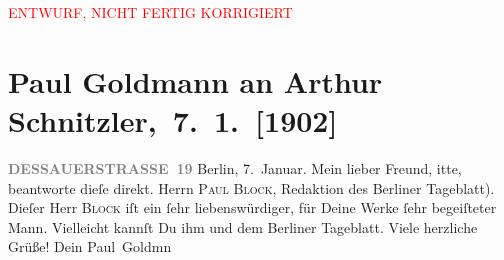 
\begin{center}
            \textcolor{red}{ENTWURF, NICHT FERTIG KORRIGIERT}
                      \end{center}
            
         
         \renewcommand{\erwaehntePersonen}{Personen: Paul Block}
         \renewcommand{\erwaehnteInstitutionen}{Institutionen: Berliner Tageblatt}
         \renewcommand{\erwaehnteOrte}{Orte: Berlin, Dessauer Straße, Wien}
         \renewcommand{\erwaehnteWerke}{}
               \section[ Paul Goldmann an Arthur Schnitzler, 7. 1. {[}1902{]}]{ Paul Goldmann an Arthur Schnitzler, 7. 1. {[}1902{]}}\nopagebreak{}\rehead{ }\begin{ledgroupsized}[t]{13cm}\normalsize\beginnumbering \toendnotes[C]{\smallbreak\pagebreak[2]} 
\toendnotes[C]{\smallbreak}\pstart
           \noindent{}\raggedleft{}{\pb}\textcolor{gray}{\textbf{DESSAUERSTRASSE 19}}\pend
           \pstart
           Berlin, 7. Januar.\pend
           \pstart\center{}Mein lieber Freund,\pend\pstart
           itte, beantworte dieſe \label{K_L03191-2v}\label{K_L03191-2h}
               direkt. \damage{(}Herrn \textsc{Paul Block}, Redaktion des Berliner Tageblatt).  Dieſer Herr \textsc{Block} iſt ein ſehr liebenswürdiger, für Deine Werke ſehr begeiſteter Mann. Vielleicht
               kannſt Du ihm und dem Berliner Tageblatt\label{K_L03191-1v}\label{K_L03191-1h}. Viele herzliche Grüße! Dein \spacefill\mbox{Paul
                  Goldmn}\pend
           
         
         \endnumbering{}\end{ledgroupsized}  \newcommand{\dateiname}{L03191}\newcommand{\titel}{Paul Goldmann an Arthur Schnitzler, 7. 1. [1902]}\newcommand{\editorInnen}{Martin Anton Müller und Laura Untner}
      